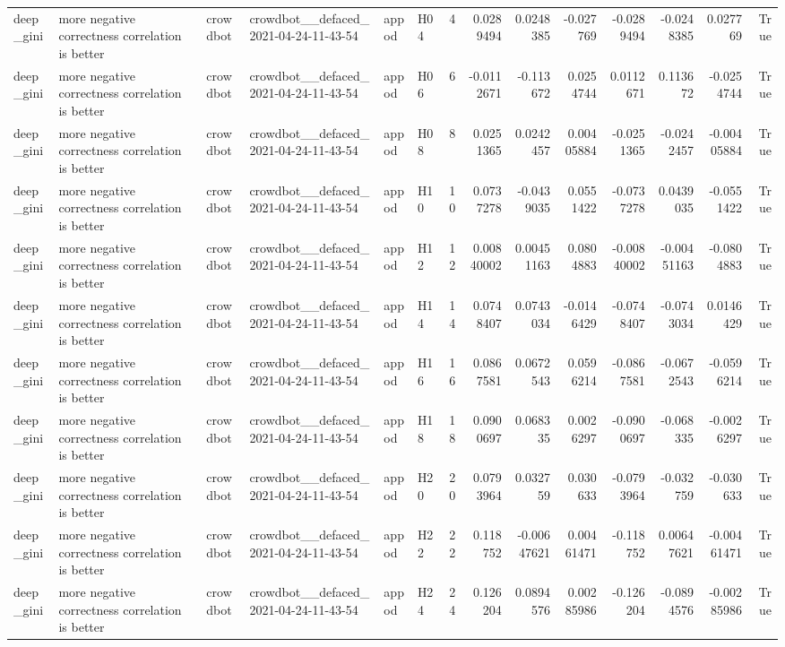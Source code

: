 \begin{longtable}{llllllrrrrrrrr}
deep\_gini & more negative correctness correlation is better & crowdbot & crowdbot\_\_defaced\_2021-04-24-11-43-54 & appod & H04 & 4 & 0.0289494 & 0.0248385 & -0.027769 & -0.0289494 & -0.0248385 & 0.027769 & True \\
deep\_gini & more negative correctness correlation is better & crowdbot & crowdbot\_\_defaced\_2021-04-24-11-43-54 & appod & H06 & 6 & -0.0112671 & -0.113672 & 0.0254744 & 0.0112671 & 0.113672 & -0.0254744 & True \\
deep\_gini & more negative correctness correlation is better & crowdbot & crowdbot\_\_defaced\_2021-04-24-11-43-54 & appod & H08 & 8 & 0.0251365 & 0.0242457 & 0.00405884 & -0.0251365 & -0.0242457 & -0.00405884 & True \\
deep\_gini & more negative correctness correlation is better & crowdbot & crowdbot\_\_defaced\_2021-04-24-11-43-54 & appod & H10 & 10 & 0.0737278 & -0.0439035 & 0.0551422 & -0.0737278 & 0.0439035 & -0.0551422 & True \\
deep\_gini & more negative correctness correlation is better & crowdbot & crowdbot\_\_defaced\_2021-04-24-11-43-54 & appod & H12 & 12 & 0.00840002 & 0.00451163 & 0.0804883 & -0.00840002 & -0.00451163 & -0.0804883 & True \\
deep\_gini & more negative correctness correlation is better & crowdbot & crowdbot\_\_defaced\_2021-04-24-11-43-54 & appod & H14 & 14 & 0.0748407 & 0.0743034 & -0.0146429 & -0.0748407 & -0.0743034 & 0.0146429 & True \\
deep\_gini & more negative correctness correlation is better & crowdbot & crowdbot\_\_defaced\_2021-04-24-11-43-54 & appod & H16 & 16 & 0.0867581 & 0.0672543 & 0.0596214 & -0.0867581 & -0.0672543 & -0.0596214 & True \\
deep\_gini & more negative correctness correlation is better & crowdbot & crowdbot\_\_defaced\_2021-04-24-11-43-54 & appod & H18 & 18 & 0.0900697 & 0.068335 & 0.0026297 & -0.0900697 & -0.068335 & -0.0026297 & True \\
deep\_gini & more negative correctness correlation is better & crowdbot & crowdbot\_\_defaced\_2021-04-24-11-43-54 & appod & H20 & 20 & 0.0793964 & 0.032759 & 0.030633 & -0.0793964 & -0.032759 & -0.030633 & True \\
deep\_gini & more negative correctness correlation is better & crowdbot & crowdbot\_\_defaced\_2021-04-24-11-43-54 & appod & H22 & 22 & 0.118752 & -0.00647621 & 0.00461471 & -0.118752 & 0.00647621 & -0.00461471 & True \\
deep\_gini & more negative correctness correlation is better & crowdbot & crowdbot\_\_defaced\_2021-04-24-11-43-54 & appod & H24 & 24 & 0.126204 & 0.0894576 & 0.00285986 & -0.126204 & -0.0894576 & -0.00285986 & True \\

\end{longtable}
